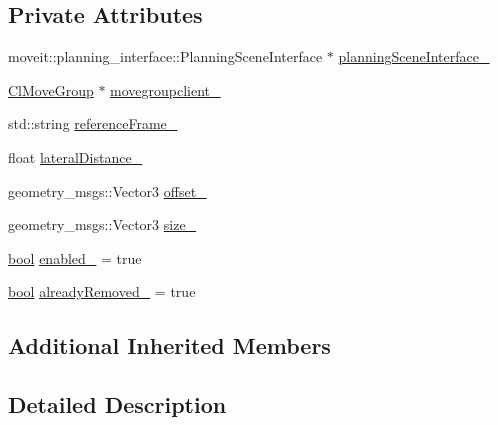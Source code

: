 \subsection*{Private Attributes}
\begin{DoxyCompactItemize}
\item 
moveit\+::planning\+\_\+interface\+::\+Planning\+Scene\+Interface $\ast$ \hyperlink{classsm__moveit__4_1_1cl__moveit__z__client_1_1CpConstraintLateralWorkspace_a39ac03e23023aef4e90f6bdd2ea41f75}{planning\+Scene\+Interface\+\_\+}
\item 
\hyperlink{classmoveit__z__client_1_1ClMoveGroup}{Cl\+Move\+Group} $\ast$ \hyperlink{classsm__moveit__4_1_1cl__moveit__z__client_1_1CpConstraintLateralWorkspace_aa68ed53b682a07e3dcf2ef4f11710b73}{movegroupclient\+\_\+}
\item 
std\+::string \hyperlink{classsm__moveit__4_1_1cl__moveit__z__client_1_1CpConstraintLateralWorkspace_a69be978ebfd12ba0ada5d4ccf4333a06}{reference\+Frame\+\_\+}
\item 
float \hyperlink{classsm__moveit__4_1_1cl__moveit__z__client_1_1CpConstraintLateralWorkspace_afe12f95ff8a79564f4f7d944b2c3cf1d}{lateral\+Distance\+\_\+}
\item 
geometry\+\_\+msgs\+::\+Vector3 \hyperlink{classsm__moveit__4_1_1cl__moveit__z__client_1_1CpConstraintLateralWorkspace_a511cfdaa29f05d8b81a3c53b7241c51e}{offset\+\_\+}
\item 
geometry\+\_\+msgs\+::\+Vector3 \hyperlink{classsm__moveit__4_1_1cl__moveit__z__client_1_1CpConstraintLateralWorkspace_a35fb6ec0933eff1c2e4a7930b9815fcb}{size\+\_\+}
\item 
\hyperlink{classbool}{bool} \hyperlink{classsm__moveit__4_1_1cl__moveit__z__client_1_1CpConstraintLateralWorkspace_a869220e440aadc79cf5213b6d27c1217}{enabled\+\_\+} = true
\item 
\hyperlink{classbool}{bool} \hyperlink{classsm__moveit__4_1_1cl__moveit__z__client_1_1CpConstraintLateralWorkspace_a9d195448b13cc11a2043197ee4885e05}{already\+Removed\+\_\+} = true
\end{DoxyCompactItemize}
\subsection*{Additional Inherited Members}


\subsection{Detailed Description}


